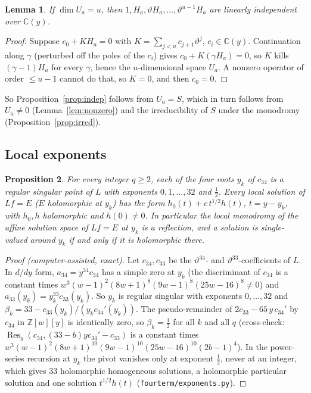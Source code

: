 \documentclass[11pt]{amsart}
\newtheorem{proposition}{Proposition}[section]
\newtheorem{lemma}[proposition]{Lemma}
\theoremstyle{definition}
\theoremstyle{remark}
\numberwithin{equation}{section}
\newcommand{\ZZ}{\mathbb{Z}}
\newcommand{\CC}{\mathbb{C}}
\newcommand{\Res}{\operatorname{Res}}
\newcommand{\file}[1]{{\def\_{\textunderscore\allowbreak}\texttt{#1}}}
\begin{document}
\begin{lemma}\label{lem:indep}
If $\dim U_a=u$, then $1,H_a,\vartheta H_a,\dots,\vartheta^{u-1}H_a$ are linearly independent over $\CC(y)$.
\end{lemma}

\begin{proof}
Suppose $c_0+KH_a=0$ with $K=\sum_{j<u}c_{j+1}\vartheta^j$, $c_i\in\CC(y)$. Continuation along $\gamma$ (perturbed off
the poles of the $c_i$) gives $c_0+K(\gamma H_a)=0$, so $K$ kills $(\gamma-1)H_a$ for every $\gamma$, hence the
$u$-dimensional space $U_a$. A nonzero operator of order $\le u-1$ cannot do that, so $K=0$, and then $c_0=0$.
\end{proof}

So Proposition~\ref{prop:indep} follows from $U_a=S$, which in turn follows from $U_a\ne0$
(Lemma~\ref{lem:nonzero}) and the irreducibility of $S$ under the monodromy (Proposition~\ref{prop:irred}).

\subsection{Local exponents}

\begin{proposition}\label{prop:exponents}
For every integer $q\ge2$, each of the four roots $y_k$ of $c_{34}$ is a regular singular point of $L$ with exponents
$0,1,\dots,32$ and $\tfrac12$. Every local solution of $Lf=E$ ($E$ holomorphic at $y_k$) has the form
$h_0(t)+c\,t^{1/2}h(t)$, $t=y-y_k$, with $h_0,h$ holomorphic and $h(0)\ne0$. In particular the local monodromy of the
affine solution space of $Lf=E$ at $y_k$ is a reflection, and a solution is single-valued around $y_k$ if and only if it
is holomorphic there.
\end{proposition}

\begin{proof}[Proof (computer-assisted, exact)]
Let $c_{34},c_{33}$ be the $\vartheta^{34}$- and $\vartheta^{33}$-coefficients of $L$. In $d/dy$ form,
$a_{34}=y^{34}c_{34}$ has a simple zero at $y_k$ (the discriminant of $c_{34}$ is a constant times
$w^3(w-1)^2(8w+1)^8(9w-1)^8(25w-16)^8\ne0$) and $a_{33}(y_k)=y_k^{33}c_{33}(y_k)$. So $y_k$ is regular singular with
exponents $0,\dots,32$ and $\beta_k=33-c_{33}(y_k)/(y_kc_{34}'(y_k))$. The pseudo-remainder of $2c_{33}-65\,y\,c_{34}'$
by $c_{34}$ in $\ZZ[w][y]$ is identically zero, so $\beta_k=\frac12$ for all $k$ and all $q$ (cross-check:
$\Res_y(c_{34},(33-b)yc_{34}'-c_{33})$ is a constant times $w^3(w-1)^2(8w+1)^{10}(9w-1)^{10}(25w-16)^{10}(2b-1)^4$). In
the power-series recursion at $y_k$ the pivot vanishes only at exponent $\frac12$, never at an integer, which gives $33$
holomorphic homogeneous solutions, a holomorphic particular solution and one solution $t^{1/2}h(t)$
(\file{fourterm/exponents.py}).
\end{proof}
\end{document}
